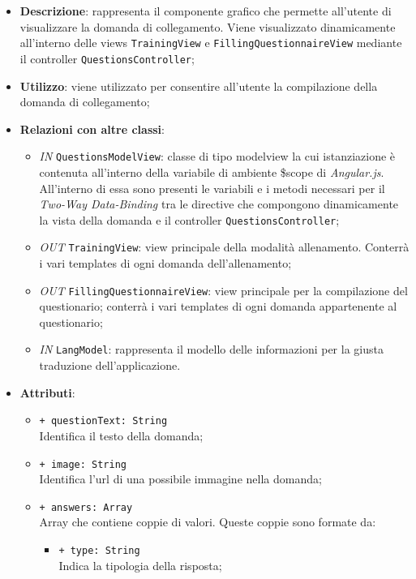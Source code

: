 		\begin{itemize}
			\item \textbf{Descrizione}: rappresenta il componente grafico che permette all'utente di visualizzare la domanda di collegamento. Viene visualizzato dinamicamente all'interno delle views \texttt{TrainingView} e \texttt{FillingQuestionnaireView} mediante il controller \texttt{QuestionsController};
			\item \textbf{Utilizzo}: viene utilizzato per consentire all'utente la compilazione della domanda di collegamento;
			\item \textbf{Relazioni con altre classi}: 
			\begin{itemize}
				\item \textit{IN} \texttt{QuestionsModelView}: classe di tipo modelview la cui istanziazione è contenuta all'interno della variabile di ambiente \$scope di \textit{Angular.js}. All'interno di essa sono presenti le variabili e i metodi necessari per il \textit{Two-Way Data-Binding} tra le directive che compongono dinamicamente la vista della domanda e il controller \texttt{QuestionsController};
				\item \textit{OUT} \texttt{TrainingView}: view principale della modalità allenamento. Conterrà i vari templates di ogni domanda dell'allenamento;
				\item \textit{OUT} \texttt{FillingQuestionnaireView}: view principale per la compilazione del questionario; conterrà i vari templates di ogni domanda appartenente al questionario;   
				\item \textit{IN} \texttt{LangModel}: rappresenta il modello delle informazioni per la giusta traduzione dell'applicazione.
			\end{itemize}
			\item \textbf{Attributi}: 
			\begin{itemize}
				\item \texttt{+ questionText: String} \\ Identifica il testo della domanda;
				\item \texttt{+ image: String} \\ Identifica l'url di una possibile immagine nella domanda;
				\item \texttt{+ answers: Array} \\ Array che contiene coppie di valori. Queste coppie sono formate da:
				\begin{itemize}
					\item \texttt{+ type: String} \\ Indica la tipologia della risposta;

\end{itemize}
\end{itemize}
\end{itemize}
